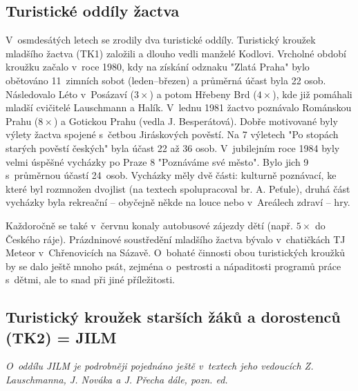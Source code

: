 \documentclass[a5paper, 11pt, twoside]{article}
\newcommand{\pozned}[1]{%
\textit{#1}}
\begin{document}
\subsection{Turistické oddíly
žactva}

V~osmdesátých letech se zrodily dva turistické oddíly. Turistický
kroužek mladšího žactva (TK1) založili a dlouho vedli manželé Kodlovi.
Vrcholné období kroužku začalo v~roce 1980, kdy na získání odznaku
"Zlatá Praha" bylo obětováno 11~zimních sobot (leden--březen) a
průměrná účast byla 22 osob. Následovalo Léto v~Posázaví (\(3\times\)) a potom
Hřebeny Brd (\(4\times\)), kde již pomáhali mladší cvičitelé Lauschmann a Halík.
V~lednu 1981 žactvo poznávalo Románskou Prahu (\(8\times\)) a Gotickou Prahu
(vedla J. Besperátová). Dobře motivované byly výlety žactva spojené
s~četbou Jiráskových pověstí. Na 7 výletech "Po stopách starých pověstí
českých" byla účast 22 až 36 osob. V~jubilejním roce 1984 byly velmi
úspěšné vycházky po Praze 8 "Poznáváme své město". Bylo jich 9
s~průměrnou účastí 24~osob. Vycházky měly dvě části: kulturně poznávací,
ke které byl rozmnožen dvojlist (na textech spolupracoval br. A.
Peťule), druhá část vycházky byla rekreační -- obyčejně někde na louce
nebo v~Areálech zdraví -- hry.

Každoročně se také v~červnu konaly autobusové zájezdy dětí (např. \(5\times\) do
Českého ráje). Prázdninové soustředění mladšího žactva bývalo
v~chatičkách TJ Meteor v~Chřenovicích na Sázavě. O~bohaté činnosti obou
turistických kroužků by se dalo ještě mnoho psát, zejména o~pestrosti a
nápaditosti programů práce s~dětmi, ale to snad při jiné příležitosti.

\clearpage
\subsection{Turistický kroužek starších žáků a dorostenců (TK2) =
JILM}

\pozned{O~oddílu JILM je podrobněji pojednáno ještě v~textech jeho
vedoucích Z. Lauschmanna, J. Nováka a J. Přecha dále, pozn. ed.}
\end{document}

